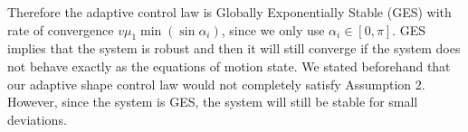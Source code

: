Therefore the adaptive control law is Globally Exponentially Stable (GES) with rate of convergence $v \mu_1 \min (\sin \alpha_i)$, since we only use $\alpha_i \in [0,\pi]$. GES implies that the system is robust and then it will still converge if the system does not behave exactly as the equations of motion state. We stated beforehand that our adaptive shape control law would not completely satisfy Assumption 2. However, since the system is GES, the system will still be stable for small deviations.


